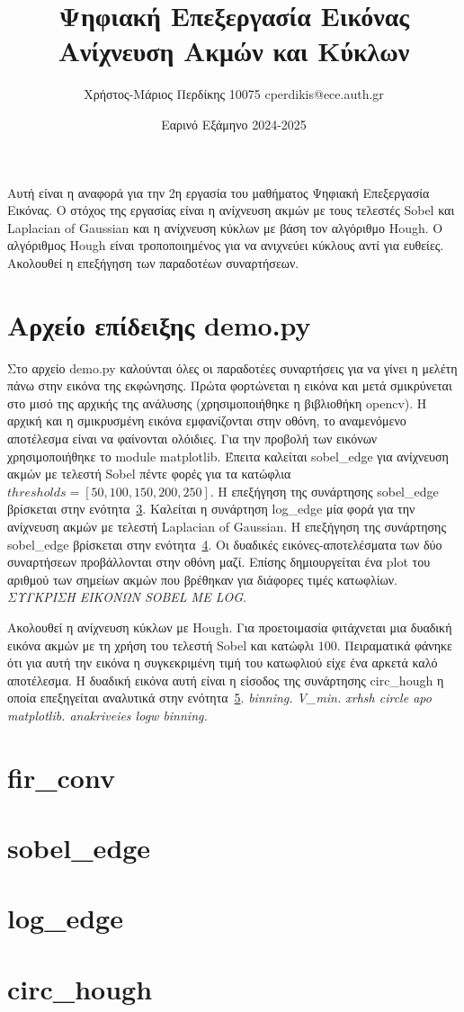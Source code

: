 \documentclass{article}
\title{Ψηφιακή Επεξεργασία Εικόνας \\ Ανίχνευση Ακμών και Κύκλων}
\date{Εαρινό Εξάμηνο 2024-2025}
\author{Χρήστος-Μάριος Περδίκης 10075 cperdikis@ece.auth.gr}
\begin{document}
\maketitle

Αυτή είναι η αναφορά για την 2η εργασία του μαθήματος Ψηφιακή Επεξεργασία 
Εικόνας. Ο στόχος της εργασίας είναι η ανίχνευση ακμών με τους τελεστές Sobel
και Laplacian of Gaussian και η ανίχνευση κύκλων με βάση τον αλγόριθμο Hough.
O αλγόριθμος Hough είναι τροποποιημένος για να ανιχνεύει κύ\-κλους αντί για 
ευθείες. Ακολουθεί η επεξήγηση των παραδοτέων συναρτήσεων.

\section{Αρχείο επίδειξης demo.py}
Στο αρχείο demo.py καλούνται όλες οι παραδοτέες συναρτήσεις για να γίνει η 
μελέτη πάνω στην εικόνα της εκφώνησης. Πρώτα φορτώνεται η εικόνα και μετά 
σμικρύνεται στο μισό της αρχικής της ανάλυσης (χρησιμοποιήθηκε η βιβλιοθήκη
opencv). Η αρχική και η σμικρυσμένη εικόνα εμφανίζονται στην οθόνη, το αναμενόμενο 
αποτέλεσμα είναι να φαίνονται ολόιδιες. Για την προβολή των εικόνων 
χρησιμοποιήθηκε το module matplotlib. Έπειτα καλείται sobel\_edge για ανίχνευση ακμών 
με τελεστή Sobel πέντε φορές για τα κατώφλια $thresholds = \left[50,100,150,
200,250\right]$. Η επεξήγηση της συνάρτησης sobel\_edge βρίσκεται στην 
ενότητα~\ref{sobel}. Καλείται η συνάρτηση log\_edge μία φορά για την ανίχνευση ακμών με
τελεστή Laplacian of Gaussian. Η επεξήγηση της συνάρτησης sobel\_edge βρίσκεται στην 
ενότητα~\ref{log}. Οι δυαδικές εικόνες-αποτελέσματα των δύο συναρτήσεων 
προβάλλονται στην οθόνη μαζί. Επίσης δημιουργείται
ένα plot του αριθμού των σημείων ακμών που βρέθηκαν για διάφορες τιμές κατωφλίων. 
\emph{ΣΥΓΚΡΙΣΗ ΕΙΚΟΝΩΝ SOBEL ΜΕ LOG}.

Ακολουθεί η ανίχνευση κύκλων με Hough. Για προετοιμασία φιτάχνεται μια δυαδική
εικόνα ακμών με τη χρήση του τελεστή Sobel και κατώφλι $100$. Πειραματικά 
φάνηκε ότι για αυτή την εικόνα η συγκεκριμένη τιμή του κατωφλιού είχε ένα 
αρκετά καλό αποτέλεσμα. Η δυαδική εικόνα αυτή είναι η είσοδος της συνάρτησης 
circ\_hough η οποία επεξηγείται αναλυτικά στην ενότητα~\ref{hough}. 
\emph{binning. V\_min. xrhsh circle apo matplotlib. anakriveies logw binning.} 
\section{fir\_conv}

\section{sobel\_edge}\label{sobel}

\section{log\_edge}\label{log}

\section{circ\_hough}\label{hough}
\end{document}
